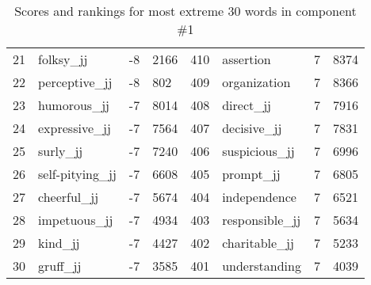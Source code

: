 \begin{table}[tbp]
\begin{tabular}{| rlr@{.}l | rlr@{.}l |}
    21 & folksy\_jj & -8 & 2166    &    410 & assertion & 7 & 8374 \\
    22 & perceptive\_jj & -8 & 802    &    409 & organization & 7 & 8366 \\
    23 & humorous\_jj & -7 & 8014    &    408 & direct\_jj & 7 & 7916 \\
    24 & expressive\_jj & -7 & 7564    &    407 & decisive\_jj & 7 & 7831 \\
    25 & surly\_jj & -7 & 7240    &    406 & suspicious\_jj & 7 & 6996 \\
    26 & self-pitying\_jj & -7 & 6608    &    405 & prompt\_jj & 7 & 6805 \\
    27 & cheerful\_jj & -7 & 5674    &    404 & independence & 7 & 6521 \\
    28 & impetuous\_jj & -7 & 4934    &    403 & responsible\_jj & 7 & 5634 \\
    29 & kind\_jj & -7 & 4427    &    402 & charitable\_jj & 7 & 5233 \\
    30 & gruff\_jj & -7 & 3585    &    401 & understanding & 7 & 4039 \\
    \hline
    \end{tabular}
    \caption{Scores and rankings for most extreme 30 words in component \#1} 
\end{table}
\clearpage
